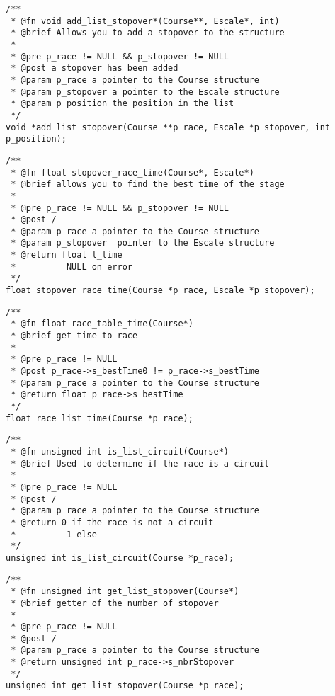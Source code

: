 \documentclass[a4paper, 11pt, oneside]{article}
\begin{document}
		\begin{lstlisting}
/**
 * @fn void add_list_stopover*(Course**, Escale*, int)
 * @brief Allows you to add a stopover to the structure
 *
 * @pre p_race != NULL && p_stopover != NULL
 * @post a stopover has been added
 * @param p_race a pointer to the Course structure
 * @param p_stopover a pointer to the Escale structure
 * @param p_position the position in the list
 */
void *add_list_stopover(Course **p_race, Escale *p_stopover, int p_position);
		\end{lstlisting}

		\begin{lstlisting}
/**
 * @fn float stopover_race_time(Course*, Escale*)
 * @brief allows you to find the best time of the stage
 *
 * @pre p_race != NULL && p_stopover != NULL
 * @post /
 * @param p_race a pointer to the Course structure
 * @param p_stopover  pointer to the Escale structure
 * @return float l_time
 * 			NULL on error
 */
float stopover_race_time(Course *p_race, Escale *p_stopover);
		\end{lstlisting}

\newpage
		\begin{lstlisting}
/**
 * @fn float race_table_time(Course*)
 * @brief get time to race
 *
 * @pre p_race != NULL
 * @post p_race->s_bestTime0 != p_race->s_bestTime
 * @param p_race a pointer to the Course structure
 * @return float p_race->s_bestTime
 */
float race_list_time(Course *p_race);
		\end{lstlisting}

		\begin{lstlisting}
/**
 * @fn unsigned int is_list_circuit(Course*)
 * @brief Used to determine if the race is a circuit
 *
 * @pre p_race != NULL
 * @post /
 * @param p_race a pointer to the Course structure
 * @return 0 if the race is not a circuit
 * 			1 else
 */
unsigned int is_list_circuit(Course *p_race);
		\end{lstlisting}

		\begin{lstlisting}
/**
 * @fn unsigned int get_list_stopover(Course*)
 * @brief getter of the number of stopover
 *
 * @pre p_race != NULL
 * @post /
 * @param p_race a pointer to the Course structure
 * @return unsigned int p_race->s_nbrStopover
 */
unsigned int get_list_stopover(Course *p_race);
		\end{lstlisting}

	\newpage
\end{document}
